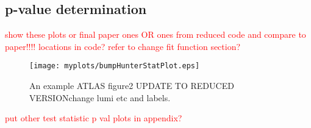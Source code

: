 \documentclass[UKenglish]{latex/atlasdoc}
\begin{document}
\subsection{p-value determination}
\label{subsec:pval}

\textcolor{red}{show these plots or final paper ones OR ones from reduced code and compare to paper!!!! locations in code? refer to change fit function section? }
\begin{figure}[htbp]
  \centering
  \texttt{[image: myplots/bumpHunterStatPlot.eps]}
  \caption{An example ATLAS figure2 UPDATE TO REDUCED VERSIONchange lumi etc and labels.}
  \label{fig:example2}
\end{figure}
\textcolor{red}{put other test statistic p val plots in appendix?}

\end{document}
